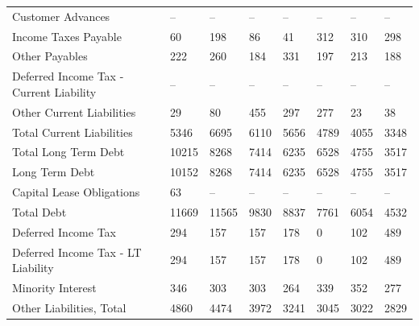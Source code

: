 \documentclass[grad,numbers]{coppe}
\begin{document}
\begin{longtable}[t]{llllllll}
  \hspace{1em}\hspace{1em}Customer Advances & -- & -- & -- & -- & -- & -- & --\\
  \hspace{1em}\hspace{1em}Income Taxes Payable & 60 & 198 & 86 & 41 & 312 & 310 & 298\\
  \hspace{1em}\hspace{1em}Other Payables & 222 & 260 & 184 & 331 & 197 & 213 & 188\\
  \hspace{1em}\hspace{1em}Deferred Income Tax - Current Liability & -- & -- & -- & -- & -- & -- & --\\
  \hspace{1em}\hspace{1em}Other Current Liabilities & 29 & 80 & 455 & 297 & 277 & 23 & 38\\
  \hspace{1em}Total Current Liabilities & 5346 & 6695 & 6110 & 5656 & 4789 & 4055 & 3348\\
  \hspace{1em}Total Long Term Debt & 10215 & 8268 & 7414 & 6235 & 6528 & 4755 & 3517\\
  \hspace{1em}\hspace{1em}Long Term Debt & 10152 & 8268 & 7414 & 6235 & 6528 & 4755 & 3517\\
  \hspace{1em}\hspace{1em}Capital Lease Obligations & 63 & -- & -- & -- & -- & -- & --\\
  \hspace{1em}Total Debt & 11669 & 11565 & 9830 & 8837 & 7761 & 6054 & 4532\\
  \hspace{1em}Deferred Income Tax & 294 & 157 & 157 & 178 & 0 & 102 & 489\\
  \hspace{1em}\hspace{1em}Deferred Income Tax - LT Liability & 294 & 157 & 157 & 178 & 0 & 102 & 489\\
  \hspace{1em}Minority Interest & 346 & 303 & 303 & 264 & 339 & 352 & 277\\
  \hspace{1em}Other Liabilities, Total & 4860 & 4474 & 3972 & 3241 & 3045 & 3022 & 2829\\

\end{longtable}
\end{document}
